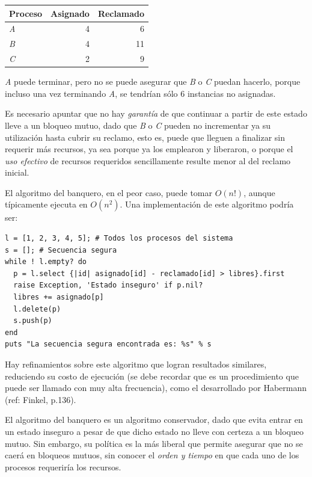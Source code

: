 \documentclass[11pt,fleqn]{book} %
\begin{document}
\begin{center}
\begin{tabular}{lrr}
 Proceso   &  Asignado  &  Reclamado  \\
\hline
 \emph{A}  &         4  &          6  \\
 \emph{B}  &         4  &         11  \\
 \emph{C}  &         2  &          9  \\
\end{tabular}
\end{center}



\emph{A} puede terminar, pero no se puede asegurar que \emph{B} o \emph{C} puedan
hacerlo, porque incluso una vez terminando \emph{A}, se tendrían sólo 6
instancias no asignadas.

Es necesario apuntar que no hay \emph{garantía} de que continuar a partir
de este estado lleve a un bloqueo mutuo, dado que \emph{B} o \emph{C} pueden no
incrementar ya su utilización hasta cubrir su reclamo, esto es, puede
que lleguen a finalizar sin requerir más recursos, ya sea porque ya
los emplearon y liberaron, o porque el \emph{uso efectivo} de recursos
requeridos sencillamente resulte menor al del reclamo inicial.

El algoritmo del banquero, en el peor caso, puede tomar $O(n!)$,
aunque típicamente ejecuta en $O(n^2)$. Una implementación de este
algoritmo podría ser:


\begin{verbatim}
l = [1, 2, 3, 4, 5]; # Todos los procesos del sistema
s = []; # Secuencia segura
while ! l.empty? do
  p = l.select {|id| asignado[id] - reclamado[id] > libres}.first
  raise Exception, 'Estado inseguro' if p.nil?
  libres += asignado[p]
  l.delete(p)
  s.push(p)
end
puts "La secuencia segura encontrada es: %s" % s
\end{verbatim}

Hay refinamientos sobre este algoritmo que logran resultados
similares, reduciendo su costo de ejecución (se debe recordar que es
un procedimiento que puede ser llamado con muy alta frecuencia), como
el desarrollado por Habermann (ref: Finkel, p.136).

El algoritmo del banquero es un algoritmo conservador, dado que evita
entrar en un estado inseguro a pesar de que dicho estado no lleve con
certeza a un bloqueo mutuo. Sin embargo, su política es la más liberal
que permite asegurar que no se caerá en bloqueos mutuos, sin conocer el
\emph{orden y tiempo} en que cada uno de los procesos requeriría los
recursos.
\end{document}
